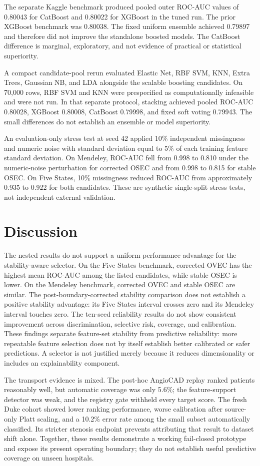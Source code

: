 \documentclass[journal]{IEEEtran}
\begin{document}
The separate Kaggle benchmark produced pooled outer ROC-AUC values of 0.80043
for CatBoost and 0.80022 for XGBoost in the tuned run. The prior XGBoost
benchmark was 0.80038. The fixed uniform ensemble achieved 0.79897 and
therefore did not improve the standalone boosted models. The CatBoost
difference is marginal, exploratory, and not evidence of practical or
statistical superiority.

A compact candidate-pool rerun evaluated Elastic Net, RBF SVM, KNN, Extra
Trees, Gaussian NB, and LDA alongside the scalable boosting candidates. On
70,000 rows, RBF SVM and KNN were prespecified as computationally infeasible
and were not run. In that separate protocol, stacking achieved pooled
ROC-AUC 0.80028, XGBoost 0.80008, CatBoost 0.79998, and fixed soft voting
0.79943. The small differences do not establish an ensemble or model
superiority.

An evaluation-only stress test at seed 42 applied 10\% independent missingness
and numeric noise with standard deviation equal to 5\% of each training feature
standard deviation. On Mendeley, ROC-AUC fell from 0.998 to 0.810 under the
numeric-noise perturbation for corrected OSEC and from 0.998 to 0.815 for stable
OSEC. On Five States, 10\% missingness reduced ROC-AUC from approximately 0.935
to 0.922 for both candidates. These are synthetic single-split stress tests,
not independent external validation.

\section{Discussion}
The nested results do not support a uniform performance advantage for the
stability-aware selector. On the Five States benchmark, corrected OVEC has the
highest mean ROC-AUC among the listed candidates, while stable OSEC is lower.
On the Mendeley benchmark, corrected OVEC and stable OSEC are similar. The
post-boundary-corrected stability comparison does not establish a positive
stability advantage: its Five States interval crosses zero and its Mendeley
interval touches zero. The ten-seed reliability results do not show
consistent improvement across discrimination, selective risk, coverage, and
calibration. These findings separate feature-set stability from predictive
reliability: more repeatable feature selection does not by itself establish
better calibrated or safer predictions. A selector is not justified merely
because it reduces dimensionality or includes an explainability component.

The transport evidence is mixed. The post-hoc AngioCAD replay ranked patients
reasonably well, but automatic coverage was only 5.6\%; the feature-support
detector was weak, and the registry gate withheld every target score. The
fresh Duke cohort showed lower ranking performance, worse calibration after
source-only Platt scaling, and a 10.2\% error rate among the small subset
automatically classified. Its stricter stenosis endpoint prevents attributing
that result to dataset shift alone. Together, these results demonstrate a
working fail-closed prototype and expose its present operating boundary; they
do not establish useful predictive coverage on unseen hospitals.
\end{document}
